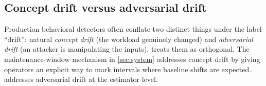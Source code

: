 \subsection{Concept drift versus adversarial drift}

Production behavioral detectors often conflate two distinct things
under the label ``drift'': natural \emph{concept drift} (the workload
genuinely changed) and \emph{adversarial drift} (an attacker is
manipulating the inputs). \chronosynd{} treats them as orthogonal.
The maintenance-window mechanism in \cref{sec:system} addresses
concept drift by giving operators an explicit way to mark intervals
where baseline shifts are expected. \sediment{} addresses
adversarial drift at the estimator level.
